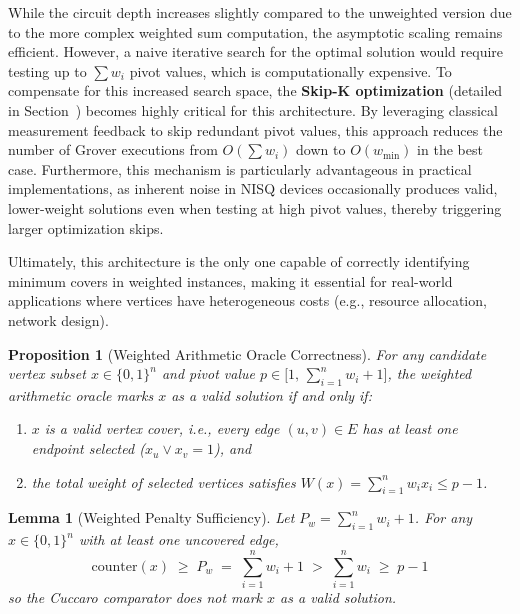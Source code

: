 \documentclass{ieeeaccess}
\newtheorem{prop}{Proposition}
\newtheorem{lemma}{Lemma}
\begin{document}
While the circuit depth increases slightly compared to the
unweighted version due to the more complex weighted sum
computation, the asymptotic scaling remains efficient.
However, a naive iterative search for the optimal solution
would require testing up to $\sum w_i$ pivot values, which
is computationally expensive. To compensate for this
increased search space, the \textbf{Skip-K optimization}
(detailed in Section~) becomes highly
critical for this architecture. By leveraging classical
measurement feedback to skip redundant pivot values, this
approach reduces the number of Grover executions from
$O(\sum w_i)$ down to $O(w_{\min})$ in the best case.
Furthermore, this mechanism is particularly advantageous in
practical implementations, as inherent noise in NISQ devices
occasionally produces valid, lower-weight solutions even when
testing at high pivot values, thereby triggering larger
optimization skips.

Ultimately, this architecture is the only one capable of
correctly identifying minimum covers in weighted instances,
making it essential for real-world applications where
vertices have heterogeneous costs (e.g., resource
allocation, network design).

\begin{prop}[Weighted Arithmetic Oracle Correctness]
\label{prop:weighted-oracle}
For any candidate vertex subset $x \in \{0,1\}^n$ and pivot
value $p \in \bigl[1,\,\sum_{i=1}^{n} w_i + 1\bigr]$, the
weighted arithmetic oracle marks $x$ as a valid solution if
and only if:
\begin{enumerate}
    \item $x$ is a valid vertex cover, i.e., every edge
    $(u,v) \in E$ has at least one endpoint selected
    ($x_u \vee x_v = 1$), and
    \item the total weight of selected vertices satisfies
    $W(x) = \sum_{i=1}^{n} w_i x_i \leq p - 1$.
\end{enumerate}
\end{prop}

\begin{lemma}[Weighted Penalty Sufficiency]
\label{lem:weighted-penalty}
Let $P_w = \sum_{i=1}^{n} w_i + 1$. For any
$x \in \{0,1\}^n$ with at least one uncovered edge,
\begin{equation}
    \mathrm{counter}(x)
    \;\geq\;
    P_w
    \;=\;
    \sum_{i=1}^{n} w_i + 1
    \;>\;
    \sum_{i=1}^{n} w_i
    \;\geq\;
    p - 1
    \label{eq:penalty-sufficiency}
\end{equation}
so the Cuccaro comparator does not mark $x$ as a valid
solution.
\end{lemma}
\end{document}
